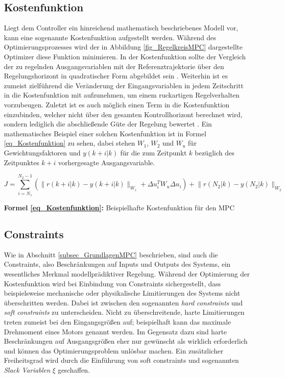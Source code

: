 \subsection{Kostenfunktion} \label{subsec_Modellbildung}
Liegt dem Controller ein hinreichend mathematisch beschriebenes Modell vor, kann eine sogenannte Kostenfunktion aufgestellt werden.
Während des Optimierungsprozesses wird der in Abbildung \ref{fig_RegelkreisMPC} dargestellte Optimizer diese Funktion minimieren.
In der Kostenfunktion sollte der Vergleich der zu regelnden Ausgangsvariablen mit der Referenztrajektorie über den Regelungshorizont in quadratischer Form abgebildet sein \cite[S. 24]{Diehl}\cite[S. 3]{Schwenzer}.
Weiterhin ist es zumeist zielführend die Veränderung der Eingangsvariablen in jedem Zeitschritt in die Kostenfunktion mit aufzunehmen, um einem ruckartigen Regelverhalten vorzubeugen.
Zuletzt ist es auch möglich einen Term in die Kostenfunktion einzubinden, welcher nicht über den gesamten Kontrollhorizont berechnet wird, sondern lediglich die abschließende Güte der Regelung bewertet \cite[S. 24]{Diehl}.
Ein mathematisches Beispiel einer solchen Kostenfunktion ist in Formel \ref{eq_Kostenfunktion} zu sehen, dabei stehen $W_1$, $W_2$ und $W_u$ für Gewichtungsfaktoren und $y(k+i\rvert k)$ für die zum Zeitpunkt $k$ bezüglich des Zeitpunktes $k+i$ vorhergesagte Ausgangsvariable. \cite[S. 3]{Schwenzer}

\begin{equation} \label{eq_Kostenfunktion}
    J = \sum_{i=N_1}^{N_2-1}\left(\lVert r(k+i\rvert k)-y(k+i\rvert k)\rVert_{W_1} + \Delta u_i^T W_u \Delta u_i\right) + \lVert r(N_2\rvert k)-y(N_2\rvert k)\rVert_{W_2}
\end{equation}
\centerline{\small{\textsf{\textbf{Formel \ref{eq_Kostenfunktion}:}} Beispielhafte Kostenfunktion für den MPC}}


\subsection{Constraints} \label{subsec_Constraints}
Wie in Abschnitt \ref{subsec_GrundlagenMPC} beschrieben, sind auch die Constraints, also Beschränkungen auf Inputs und Outputs des Systems, ein wesentliches Merkmal modellprädiktiver Regelung.
Während der Optimierung der Kostenfunktion wird bei Einbindung von Constraints sichergestellt, dass beispielsweise mechanische oder physikalische Limitierungen des Systems nicht überschritten werden.
Dabei ist zwischen den sogenannten \textit{hard constraints} und \textit{soft constraints} zu unterscheiden.
Nicht zu überschreitende, harte Limitierungen treten zumeist bei den Eingangsgrößen auf; beispielhaft kann das maximale Drehmoment eines Motors genannt werden.
Im Gegensatz dazu sind harte Beschränkungen auf Ausgangsgrößen eher nur gewünscht als wirklich erforderlich und können das Optimierungsproblem unlösbar machen.
Ein zusätzlicher Freiheitsgrad wird durch die Einführung von soft constraints und sogenannten \textit{Slack Variablen} $\xi$ geschaffen. \cite[S. 4]{Schwenzer}

